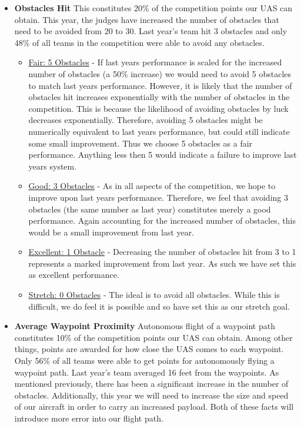 \documentclass[]{auvsi_doc}
\begin{document}
\begin{itemize}
\item \textbf{Obstacles Hit} This constitutes 20\% of the competition points our UAS can obtain. This year, the judges have increased the number of obstacles that need to be avoided from 20 to 30. Last year's team hit 3 obstacles and only 48\% of all teams in the competition were able to avoid any obstacles. 
	\begin{itemize}
	\item  \underline{Fair: 5 Obstacles} -  If last years performance is scaled for the increased number of obstacles (a 50\% increase) we would need to avoid 5 obstacles to match last years performance. However, it is likely that the number of obstacles hit increases exponentially with the number of obstacles in the competition. This is because the likelihood of avoiding obstacles by luck decreases exponentially. Therefore, avoiding 5 obstacles might be numerically equivalent to last years performance, but could still indicate some small improvement. Thus we choose 5 obstacles as a fair performance. Anything less then 5 would indicate a failure to improve last years system.
	\item \underline{Good: 3 Obstacles} -  As in all aspects of the competition, we hope to improve upon last years performance. Therefore, we feel that avoiding 3 obstacles (the same number as last year) constitutes merely a good performance. Again accounting for the increased number of obstacles, this would be a small improvement from last year.
	\item \underline{Excellent: 1 Obstacle} -  Decreasing the number of obstacles hit from 3 to 1 represents a marked improvement from last year. As such we have set this as excellent performance.
	\item \underline{Stretch: 0 Obstacles} - The ideal is to avoid all obstacles. While this is difficult, we do feel it is possible and so have set this as our stretch goal.
	\end{itemize}
\item \textbf{Average Waypoint Proximity} Autonomous flight of a waypoint path constitutes 10\% of the competition points our UAS can obtain. Among other things, points are awarded for how close the UAS comes to each waypoint. Only 56\% of all teams were able to get points for autonomously flying a waypoint path. Last year's team averaged 16 feet from the waypoints.  As mentioned previously, there has been a significant increase in the number of obstacles. Additionally, this year we will need to increase the size and speed of our aircraft in order to carry an increased payload. Both of these facts will introduce more error into our flight path. 

\end{itemize}
\end{document}
